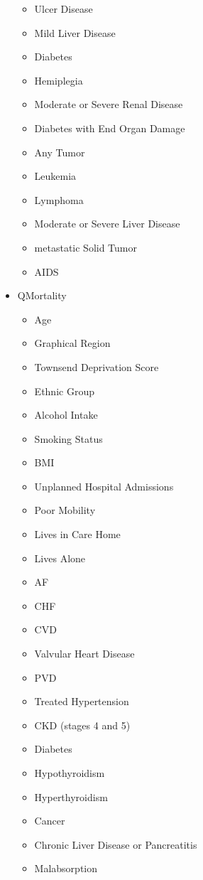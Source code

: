 \documentclass[a4paper,12pt]{article}
\begin{document}
\begin{appendices}
\begin{itemize}
\begin{itemize}
   				\item Ulcer Disease
   				\item Mild Liver Disease
   				\item Diabetes
   				\item Hemiplegia
   				\item Moderate or Severe Renal Disease
   				\item Diabetes with End Organ Damage
   				\item Any Tumor
   				\item Leukemia
   				\item Lymphoma
   				\item Moderate or Severe Liver Disease
   				\item metastatic Solid Tumor
   				\item AIDS
   			\end{itemize}
	   		\item QMortality
	   		\begin{itemize}
	   			\item Age
	   			\item Graphical Region
	   			\item Townsend Deprivation Score
	   			\item Ethnic Group
	   			\item Alcohol Intake
	   			\item Smoking Status
	   			\item BMI
	   			\item Unplanned Hospital Admissions
	   			\item Poor Mobility
	   			\item Lives in Care Home
	   			\item Lives Alone
	   			\item AF
	   			\item CHF
	   			\item CVD
	   			\item Valvular Heart Disease
	   			\item PVD
	   			\item Treated Hypertension
	   			\item CKD (stages 4 and 5)
	   			\item Diabetes
	   			\item Hypothyroidism
	   			\item Hyperthyroidism
	   			\item Cancer
	   			\item Chronic Liver Disease or Pancreatitis
	   			\item Malabsorption

\end{itemize}
\end{itemize}
\end{appendices}
\end{document}
